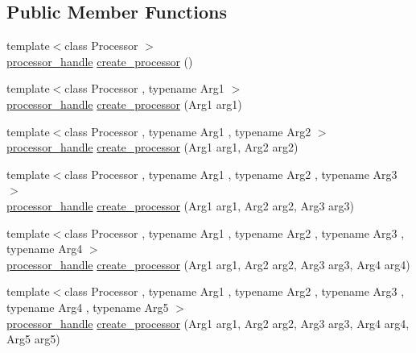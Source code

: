 \subsection*{Public Member Functions}
\begin{DoxyCompactItemize}
\item 
{\footnotesize template$<$class Processor $>$ }\\\mbox{\hyperlink{classboost_1_1statechart_1_1fifo__scheduler_ada526939c16c4f8118bc4d7bbf09ad7d}{processor\+\_\+handle}} \mbox{\hyperlink{classboost_1_1statechart_1_1fifo__scheduler_a95c23f26708dcf81e6c0f8c4618fc015}{create\+\_\+processor}} ()
\item 
{\footnotesize template$<$class Processor , typename Arg1 $>$ }\\\mbox{\hyperlink{classboost_1_1statechart_1_1fifo__scheduler_ada526939c16c4f8118bc4d7bbf09ad7d}{processor\+\_\+handle}} \mbox{\hyperlink{classboost_1_1statechart_1_1fifo__scheduler_ac03c8e9f9a1485f60ac5c13bbe961f42}{create\+\_\+processor}} (Arg1 arg1)
\item 
{\footnotesize template$<$class Processor , typename Arg1 , typename Arg2 $>$ }\\\mbox{\hyperlink{classboost_1_1statechart_1_1fifo__scheduler_ada526939c16c4f8118bc4d7bbf09ad7d}{processor\+\_\+handle}} \mbox{\hyperlink{classboost_1_1statechart_1_1fifo__scheduler_ac62b7521bb9a38912f2ce9b9694e8769}{create\+\_\+processor}} (Arg1 arg1, Arg2 arg2)
\item 
{\footnotesize template$<$class Processor , typename Arg1 , typename Arg2 , typename Arg3 $>$ }\\\mbox{\hyperlink{classboost_1_1statechart_1_1fifo__scheduler_ada526939c16c4f8118bc4d7bbf09ad7d}{processor\+\_\+handle}} \mbox{\hyperlink{classboost_1_1statechart_1_1fifo__scheduler_a0bb479c40e8b605841f4db56068fd5f5}{create\+\_\+processor}} (Arg1 arg1, Arg2 arg2, Arg3 arg3)
\item 
{\footnotesize template$<$class Processor , typename Arg1 , typename Arg2 , typename Arg3 , typename Arg4 $>$ }\\\mbox{\hyperlink{classboost_1_1statechart_1_1fifo__scheduler_ada526939c16c4f8118bc4d7bbf09ad7d}{processor\+\_\+handle}} \mbox{\hyperlink{classboost_1_1statechart_1_1fifo__scheduler_af750a0e0c749cbe56004e1a835ba06f9}{create\+\_\+processor}} (Arg1 arg1, Arg2 arg2, Arg3 arg3, Arg4 arg4)
\item 
{\footnotesize template$<$class Processor , typename Arg1 , typename Arg2 , typename Arg3 , typename Arg4 , typename Arg5 $>$ }\\\mbox{\hyperlink{classboost_1_1statechart_1_1fifo__scheduler_ada526939c16c4f8118bc4d7bbf09ad7d}{processor\+\_\+handle}} \mbox{\hyperlink{classboost_1_1statechart_1_1fifo__scheduler_aa4ccee39767ff4c0e883bcde7a637987}{create\+\_\+processor}} (Arg1 arg1, Arg2 arg2, Arg3 arg3, Arg4 arg4, Arg5 arg5)

\end{DoxyCompactItemize}
